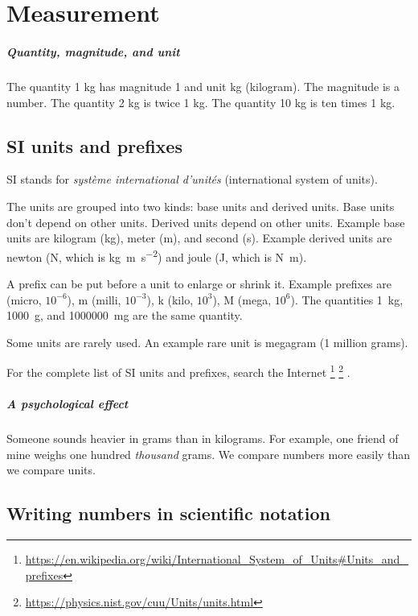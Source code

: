 \chapter{Measurement}

\paragraph{Quantity, magnitude, and unit}

The quantity 1 kg has magnitude 1 and unit kg (kilogram).
The magnitude is a number.
The quantity 2 kg is twice 1 kg.
The quantity 10 kg is ten times 1 kg.

\section{SI units and prefixes}

SI stands for \emph{syst\`eme international d'unit\'es}
(international system of units).

The units are grouped into two kinds: base units and derived units.
Base units don't depend on other units.
Derived units depend on other units.
Example base units are kilogram (kg), meter (m), and second (s).
Example derived units are newton (N, which is \si{kg.m.s^{-2}})
and joule (J, which is \si{N.m}).

A prefix can be put before a unit to enlarge or shrink it.
Example prefixes are
\si{\micro} (micro, \(10^{-6}\)),
m (milli, \(10^{-3}\)),
k (kilo, \(10^3\)),
M (mega, \(10^6\)).
The quantities \SI{1}{kg}, \SI{1000}{g}, and \SI{1000000}{mg} are the same quantity.

Some units are rarely used.
An example rare unit is megagram (1 million grams).

For the complete list of SI units and prefixes, search the Internet%
\footnote{\url{https://en.wikipedia.org/wiki/International_System_of_Units\#Units_and_prefixes}}%
\footnote{\url{https://physics.nist.gov/cuu/Units/units.html}}%
.

\paragraph{A psychological effect}
Someone sounds heavier in grams than in kilograms.
For example, one friend of mine weighs one hundred \emph{thousand} grams.
We compare numbers more easily than we compare units.

\section{Writing numbers in scientific notation}

